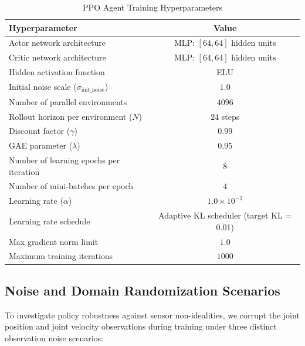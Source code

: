 \begin{table}[htbp]
  \centering
  \caption{PPO Agent Training Hyperparameters}
  \label{tab:ppo_hyperparams}
  \begin{tabular}{lc}
    \toprule
    Hyperparameter & Value \\
    \midrule
    Actor network architecture & MLP: $[64, 64]$ hidden units \\
    Critic network architecture & MLP: $[64, 64]$ hidden units \\
    Hidden activation function & ELU \\
    Initial noise scale ($\sigma_{\mathrm{init\_noise}}$) & $1.0$ \\
    Number of parallel environments & $4096$ \\
    Rollout horizon per environment ($N$) & $24$ steps \\
    Discount factor ($\gamma$) & $0.99$ \\
    GAE parameter ($\lambda$) & $0.95$ \\
    Number of learning epochs per iteration & $8$ \\
    Number of mini-batches per epoch & $4$ \\
    Learning rate ($\alpha$) & $1.0 \times 10^{-3}$ \\
    Learning rate schedule & Adaptive KL scheduler (target KL = 0.01) \\
    Max gradient norm limit & $1.0$ \\
    Maximum training iterations & $1000$ \\
    \bottomrule
  \end{tabular}
\end{table}

\subsection{Noise and Domain Randomization Scenarios}
To investigate policy robustness against sensor non-idealities, we corrupt the joint position and joint velocity observations during training under three distinct observation noise scenarios:

